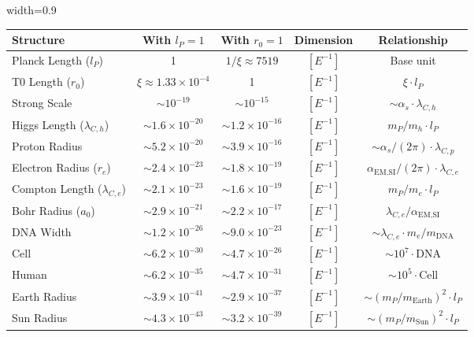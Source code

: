\documentclass[12pt,a4paper]{article}
\newcommand{\tablescale}{0.9}
\begin{document}
	\begin{table}[H]
		\centering
		\begin{adjustbox}{width=\tablescale\textwidth}
			\begin{tabular}{lcccc}
				\toprule
				\textbf{Structure} & \textbf{With \(l_P = 1\)} & \textbf{With \(r_0 = 1\)} & \textbf{Dimension} & \textbf{Relationship} \\
				\midrule
				Planck Length (\(l_P\)) & 1 & \(1/\xi \approx 7519\) & \([E^{-1}]\) & Base unit \\
				T0 Length (\(r_0\)) & \(\xi \approx 1.33 \times 10^{-4}\) & 1 & \([E^{-1}]\) & \(\xi \cdot l_P\) \\
				Strong Scale & \(\sim 10^{-19}\) & \(\sim 10^{-15}\) & \([E^{-1}]\) & \(\sim \alpha_s \cdot \lambda_{C,h}\) \\
				Higgs Length (\(\lambda_{C,h}\)) & \(\sim 1.6 \times 10^{-20}\) & \(\sim 1.2 \times 10^{-16}\) & \([E^{-1}]\) & \(m_P/m_h \cdot l_P\) \\
				Proton Radius & \(\sim 5.2 \times 10^{-20}\) & \(\sim 3.9 \times 10^{-16}\) & \([E^{-1}]\) & \(\sim \alpha_s/(2\pi) \cdot \lambda_{C,p}\) \\
				Electron Radius (\(r_e\)) & \(\sim 2.4 \times 10^{-23}\) & \(\sim 1.8 \times 10^{-19}\) & \([E^{-1}]\) & \(\alpha_{\text{EM,SI}}/(2\pi) \cdot \lambda_{C,e}\) \\
				Compton Length (\(\lambda_{C,e}\)) & \(\sim 2.1 \times 10^{-23}\) & \(\sim 1.6 \times 10^{-19}\) & \([E^{-1}]\) & \(m_P/m_e \cdot l_P\) \\
				Bohr Radius (\(a_0\)) & \(\sim 2.9 \times 10^{-21}\) & \(\sim 2.2 \times 10^{-17}\) & \([E^{-1}]\) & \(\lambda_{C,e}/\alpha_{\text{EM,SI}}\) \\
				DNA Width & \(\sim 1.2 \times 10^{-26}\) & \(\sim 9.0 \times 10^{-23}\) & \([E^{-1}]\) & \(\sim \lambda_{C,e} \cdot m_e/m_{\text{DNA}}\) \\
				Cell & \(\sim 6.2 \times 10^{-30}\) & \(\sim 4.7 \times 10^{-26}\) & \([E^{-1}]\) & \(\sim 10^7 \cdot \text{DNA}\) \\
				Human & \(\sim 6.2 \times 10^{-35}\) & \(\sim 4.7 \times 10^{-31}\) & \([E^{-1}]\) & \(\sim 10^5 \cdot \text{Cell}\) \\
				Earth Radius & \(\sim 3.9 \times 10^{-41}\) & \(\sim 2.9 \times 10^{-37}\) & \([E^{-1}]\) & \(\sim (m_P/m_{\text{Earth}})^2 \cdot l_P\) \\
				Sun Radius & \(\sim 4.3 \times 10^{-43}\) & \(\sim 3.2 \times 10^{-39}\) & \([E^{-1}]\) & \(\sim (m_P/m_{\text{Sun}})^2 \cdot l_P\) \\

\end{tabular}
\end{adjustbox}
\end{table}
\end{document}
